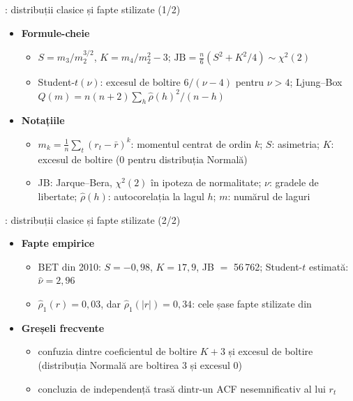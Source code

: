 \begin{frame}{: distribuții clasice și fapte stilizate (1/2)}
\itemsize{\small}
\begin{itemize}
    \item \textbf{Formule-cheie}
    \begin{itemize}
        \item $S = m_3/m_2^{3/2}$, $K = m_4/m_2^2 - 3$; $\text{JB} = \frac{n}{6}(S^2 + K^2/4) \sim \chi^2(2)$ 
        \item Student-$t(\nu)$: excesul de boltire $6/(\nu - 4)$ pentru $\nu > 4$; Ljung--Box $Q(m) = n(n+2)\sum_h \hat\rho(h)^2/(n - h)$
    \end{itemize}
    \item \textbf{Notațiile}
    \begin{itemize}
        \item $m_k = \frac1n\sum_t (r_t - \bar r)^k$: momentul centrat de ordin $k$; $S$: asimetria; $K$: excesul de boltire (0 pentru distribuția Normală)
        \item JB: Jarque--Bera, $\chi^2(2)$ în ipoteza de normalitate; $\nu$: gradele de libertate; $\hat\rho(h)$: autocorelația la lagul $h$; $m$: numărul de laguri
    \end{itemize}
\end{itemize}
\end{frame}

\begin{frame}{: distribuții clasice și fapte stilizate (2/2)}
\itemsize{\small}
\begin{itemize}
    \item \textbf{Fapte empirice}
    \begin{itemize}
        \item BET din 2010: $S = -0{,}98$, $K = 17{,}9$, JB $=$ 56\,762; Student-$t$ estimată: $\hat\nu = 2{,}96$
        \item $\hat\rho_1(r) = 0{,}03$, dar $\hat\rho_1(|r|) = 0{,}34$: cele șase fapte stilizate din 
    \end{itemize}
    \item \textbf{Greșeli frecvente}
    \begin{itemize}
        \item confuzia dintre coeficientul de boltire $K + 3$ și excesul de boltire (distribuția Normală are boltirea 3 și excesul 0)
        \item concluzia de independență trasă dintr-un ACF nesemnificativ al lui $r_t$
    \end{itemize}
\end{itemize}
\end{frame}

